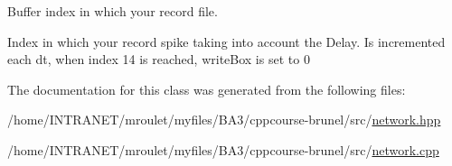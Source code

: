 Buffer index in which your record file. 

Index in which your record spike taking into account the Delay. Is incremented each dt, when index 14 is reached, write\-Box is set to 0 

The documentation for this class was generated from the following files\-:\begin{DoxyCompactItemize}
\item 
/home/\-I\-N\-T\-R\-A\-N\-E\-T/mroulet/myfiles/\-B\-A3/cppcourse-\/brunel/src/\hyperlink{network_8hpp}{network.\-hpp}\item 
/home/\-I\-N\-T\-R\-A\-N\-E\-T/mroulet/myfiles/\-B\-A3/cppcourse-\/brunel/src/\hyperlink{network_8cpp}{network.\-cpp}\end{DoxyCompactItemize}
